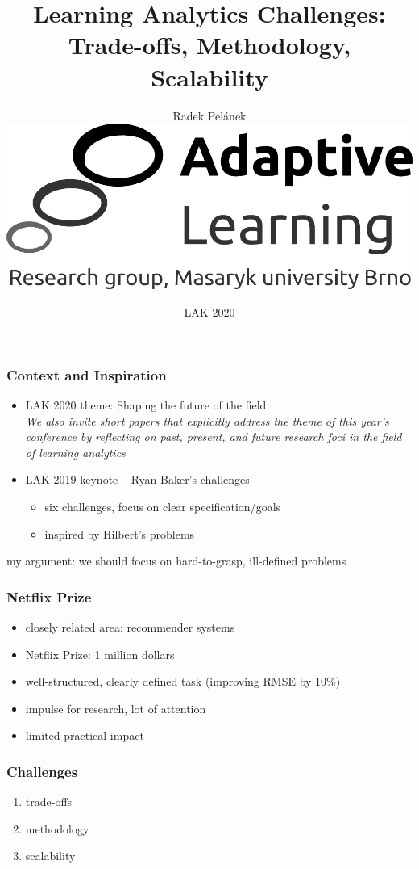 \documentclass[bigger]{beamer}
\title{Learning Analytics Challenges: Trade-offs, Methodology, Scalability}
\author{Radek Pel\'anek\\[10mm]
\includegraphics[width=.3\linewidth]{al-logo}
}
\date{LAK 2020}
\begin{document}
\frame{\titlepage}

\begin{frame}
  \frametitle{Context and Inspiration}

  \begin{itemize}
  \item LAK 2020 theme: Shaping the future of the field\\
    {\footnotesize \emph{We also invite
      short papers that explicitly address the theme of this year’s conference
      by reflecting on past, present, and future research foci in the field of
      learning analytics}}
  \item LAK 2019 keynote -- Ryan Baker's challenges
    \begin{itemize}
    \item six challenges, focus on clear specification/goals
    \item inspired by Hilbert's problems
    \end{itemize}
  \end{itemize}

  \bigskip
  my argument: we should focus on hard-to-grasp, ill-defined problems 
\end{frame}

\begin{frame}
  \frametitle{Netflix Prize}

  \begin{itemize}
  \item closely related area: recommender systems
  \item Netflix Prize: 1 million dollars
  \item well-structured, clearly defined task (improving RMSE by
    10\%)
  \item impulse for research, lot of attention
  \item limited practical impact
  \end{itemize}
\end{frame}

\begin{frame}
  \frametitle{Challenges}

  \begin{enumerate}
  \item trade-offs
  \item methodology
  \item scalability
  \end{enumerate}
\end{frame}
\end{document}
